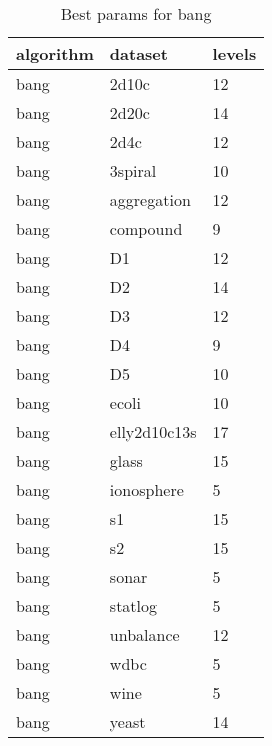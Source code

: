 \begin{table}[H]
\centering
\caption{Best params for bang}
\label{tab:params:bang}
\begin{tabular}{|l|l|l|}
\hline
algorithm & dataset & levels \\
\hline
bang & 2d10c & 12 \\
\hline
bang & 2d20c & 14 \\
\hline
bang & 2d4c & 12 \\
\hline
bang & 3spiral & 10 \\
\hline
bang & aggregation & 12 \\
\hline
bang & compound & 9 \\
\hline
bang & D1 & 12 \\
\hline
bang & D2 & 14 \\
\hline
bang & D3 & 12 \\
\hline
bang & D4 & 9 \\
\hline
bang & D5 & 10 \\
\hline
bang & ecoli & 10 \\
\hline
bang & elly2d10c13s & 17 \\
\hline
bang & glass & 15 \\
\hline
bang & ionosphere & 5 \\
\hline
bang & s1 & 15 \\
\hline
bang & s2 & 15 \\
\hline
bang & sonar & 5 \\
\hline
bang & statlog & 5 \\
\hline
bang & unbalance & 12 \\
\hline
bang & wdbc & 5 \\
\hline
bang & wine & 5 \\
\hline
bang & yeast & 14 \\
\hline
\end{tabular}
\end{table}